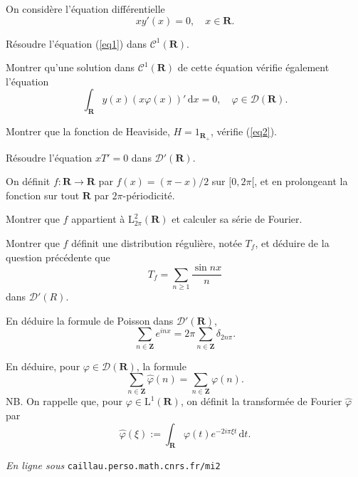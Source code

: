 \documentclass[11pt,a4paper]{article}
\def\Z{\mathbf{Z}}
\def\R{\mathbf{R}}
\def\L{\mathrm{L}}
\def\CC{\mathscr{C}}
\def\DD{\mathscr{D}}
\def\d{\mathrm{d}}
\def\vphi{\varphi}
\renewcommand{\hat}{\widehat}
\begin{document}
\begin{Exercice} On consid\`ere l'\'equation diff\'erentielle
\begin{equation} \label{eq1}
  xy'(x) = 0,\quad x \in \R.
\end{equation}

\begin{Question} R\'esoudre l'\'equation (\ref{eq1}) dans $\CC^1(\R)$.
\end{Question}

\begin{Question} Montrer qu'une solution dans $\CC^1(\R)$ de cette
\'equation v\'erifie \'egalement l'\'equation
\begin{equation} \label{eq2}
  \int_\R y(x)(x\vphi(x))'\,\d x = 0,\quad \vphi \in \DD(\R).
\end{equation}
\end{Question}

\begin{Question} Montrer que la fonction de Heaviside, $H=1_{\R_+}$, v\'erifie 
(\ref{eq2}).
\end{Question}

\begin{Question} R\'esoudre l'\'equation $xT'=0$ dans $\DD'(\R)$.
\end{Question}

\end{Exercice} \vspace*{1em}

\begin{Exercice} On d\'efinit $f : \R \to \R$ par $f(x)=(\pi-x)/2$ sur $[0,2\pi[$, et
en prolongeant la fonction sur tout $\R$ par $2\pi$-p\'eriodicit\'e.

\begin{Question} Montrer que $f$ appartient \`a $\L^2_{2\pi}(\R)$ et calculer sa
s\'erie de Fourier.
\end{Question}

\begin{Question} Montrer que $f$ d\'efinit une distribution r\'eguli\`ere, not\'ee
$T_f$, et d\'eduire de la question pr\'ec\'edente que
\[ T_f = \sum_{n \geq 1} \frac{\sin nx}{n} \]
dans $\DD'(R)$.
\end{Question}

\begin{Question} En d\'eduire la formule de Poisson dans $\DD'(\R)$,
\[ \sum_{n \in \Z} e^{inx} = 2\pi\sum_{n \in \Z} \delta_{2n\pi}. \]
\end{Question}

\begin{Question} En d\'eduire, pour $\vphi \in \DD(\R)$, la formule
\[ \sum_{n \in \Z} \hat{\vphi}(n) = \sum_{n \in \Z} \vphi(n). \]
NB. On rappelle que, pour $\vphi \in \L^1(\R)$, on d\'efinit la transform\'ee de
Fourier $\hat\vphi$ par
\[ \hat\vphi(\xi) := \int_\R \vphi(t)e^{-2i\pi\xi t}\,\d t. \]
\end{Question}

\end{Exercice} \vspace*{1em}

\vfill \begin{flushright}{\footnotesize \emph{En ligne sous}
\texttt{caillau.perso.math.cnrs.fr/mi2}} \end{flushright}
\end{document}
